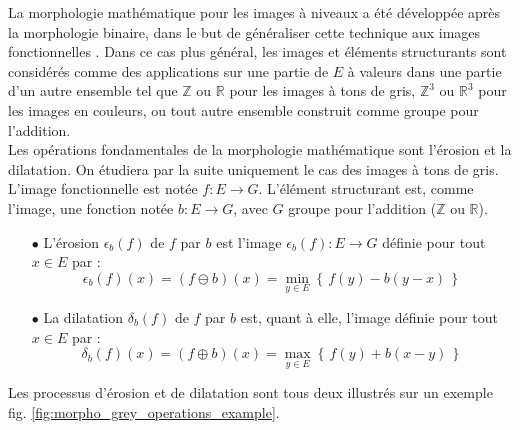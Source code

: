 La morphologie mathématique pour les images à niveaux a été développée après la morphologie binaire, dans le but de généraliser cette technique aux images fonctionnelles \cite{Haralick_1987, Serra_1992}. Dans ce cas plus général, les images et éléments structurants sont considérés comme des applications sur une partie de $E$ à valeurs dans une partie d'un autre ensemble tel que $\mathbb{Z}$ ou $\mathbb{R}$ pour les images à tons de gris, $\mathbb{Z}^3$ ou $\mathbb{R}^3$ pour les images en couleurs, ou tout autre ensemble construit comme groupe pour l'addition. \\

\vspace{-1.6mm}
Les opérations fondamentales de la morphologie mathématique sont l'érosion et la dilatation. On étudiera par la suite uniquement le cas des images à tons de gris. \\

\vspace{-1.6mm}
\noindent L'image fonctionnelle est notée $f: E \rightarrow G$. L'élément structurant est, comme l'image, une fonction notée $b: E \rightarrow G$, avec $G$ groupe pour l'addition ($\mathbb{Z}$ ou $\mathbb{R}$).

\vspace{0.4cm}
\begin{itemize}[leftmargin=*]
    \item[$\bullet$] L'érosion $\epsilon_b(f)$ de $f$ par $b$ est l'image $\epsilon_b(f) : E \rightarrow G$ définie pour tout $x \in E$ par : 
    \begin{equation}
        \epsilon_b(f)(x) = (f \ominus b)(x) = \min_{y \in E} \left \{ \, f(y) - b(y-x) \, \right \}
        \label{grey_erosion}
    \end{equation}
\end{itemize}
\vspace{0cm}
\begin{itemize}[leftmargin=*]
    \item[$\bullet$] La dilatation $\delta_b(f)$ de $f$ par $b$ est, quant à elle, l'image définie pour tout $x \in E$ par : 
    \begin{equation}
        \delta_b(f)(x) = (f \oplus b)(x) = \max_{y \in E} \left \{ \, f(y) + b(x-y) \, \right \}
        \label{grey_dilation}
    \end{equation}
\end{itemize}

\noindent Les processus d'érosion et de dilatation sont tous deux illustrés sur un exemple fig. \ref{fig:morpho_grey_operations_example}. \\

